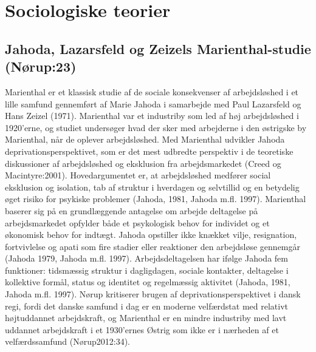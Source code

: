 

\section{Sociologiske teorier \label{}}

\subsection{Jahoda, Lazarsfeld og Zeizels Marienthal-studie (Nørup:23) \label{}}
Marienthal er et klassisk studie af de sociale konsekvenser af arbejdsløshed i et lille samfund gennemført af Marie Jahoda i samarbejde med Paul Lazarsfeld og Hans Zeizel (1971). Marienthal var et industriby som led af høj arbejdsløshed i 1920'erne, og studiet undersøger hvad der sker med arbejderne i den østrigske by Marienthal, når de oplever arbejdsløshed. Med Marienthal udvikler Jahoda deprivationsperspektivet, som er det mest udbredte perspektiv i de teoretiske diskussioner af arbejdsløshed og eksklusion fra arbejdsmarkedet (Creed og Macintyre:2001). Hovedargumentet er, at arbejdsløshed medfører social eksklusion og isolation, tab af struktur i hverdagen og selvtillid og en betydelig øget risiko for psykiske problemer (Jahoda, 1981, Jahoda m.fl. 1997). Marienthal baserer sig på en grundlæggende antagelse om arbejde deltagelse på arbejdsmarkedet opfylder både et psykologisk behov for individet og et økonomisk behov for indtægt. Jahoda opstiller ikke knækket vilje, resignation, fortvivlelse og apati som fire stadier eller reaktioner den arbejdsløse gennemgår (Jahoda 1979, Jahoda m.fl. 1997). Arbejdsdeltagelsen har ifølge Jahoda fem funktioner: tidsmæssig struktur i dagligdagen, sociale kontakter, deltagelse i kollektive formål, status og identitet og regelmæssig aktivitet (Jahoda, 1981, Jahoda m.fl. 1997).
Nørup kritiserer brugen af deprivationsperspektivet i dansk regi, fordi det danske samfund i dag er en moderne velfærdstat med relativt højtuddannet arbejdskraft, og Marienthal er en mindre industriby med lavt uddannet arbejdskraft i et 1930'ernes Østrig som ikke er i nærheden af et velfærdssamfund (Nørup2012:34).

